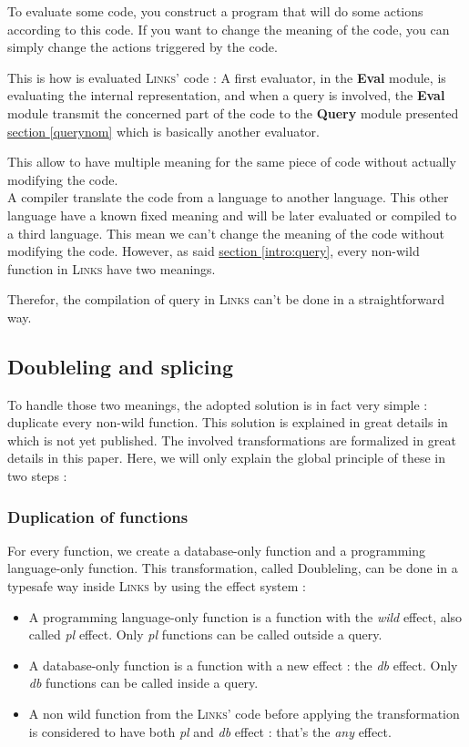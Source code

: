 \documentclass[11pt]{article}
\newcommand\mysc[1]{{\rmfamily\textsc{#1}}\xspace}
\newcommand\links{\mysc{Links}}
\newcommand\refsec[1]{\hyperref[#1]{section \ref*{#1}}}
\newcommand\effect[1]{{\em #1}}
\newcommand\module[1]{{\bf #1}}
\begin{document}
To evaluate some code, you construct a program that will do some actions according to this code. If you want to change the meaning of the code, you can simply change the actions triggered by the code. 

This is how is evaluated \links' code : A first evaluator, in the \module{Eval} module, is evaluating the internal representation, and when a query is involved, the \module{Eval} module transmit the concerned part of the code to the \module{Query} module presented \refsec{querynom} which is basically another evaluator.

This allow to have multiple meaning for the same piece of code without actually modifying the code.\\

A compiler translate the code from a language to another language. This other language have a known fixed meaning and will be later evaluated or compiled to a third language. This mean we can't change the meaning of the code without modifying the code. However, as said \refsec{intro:query}, every non-wild function in \links have two meanings.

Therefor, the compilation of query in \links can't be done in a straightforward way.

\subsection{Doubleling and splicing}

To handle those two meanings, the adopted solution is in fact very simple : duplicate every non-wild function. This solution is explained in great details in \cite{links:querycomp} which is not yet published. The involved transformations are formalized in great details in this paper. Here, we will only explain the global principle of these in two steps : 

\subsubsection{Duplication of functions}

For every function, we create a database-only function and a programming language-only function. This transformation, called Doubleling, can be done in a typesafe way inside \links by using the effect system : 
\begin{itemize}
\item A programming language-only function is a function with the \effect{wild} effect, also called \effect{pl} effect. Only \effect{pl} functions can be called outside a query.
\item A database-only function is a function with a new effect : the \effect{db} effect. Only \effect{db} functions can be called inside a query.
\item A non wild function from the \links' code before applying the transformation is considered to have both \effect{pl} and \effect{db} effect : that's the \effect{any} effect.
\end{itemize}
\end{document}
